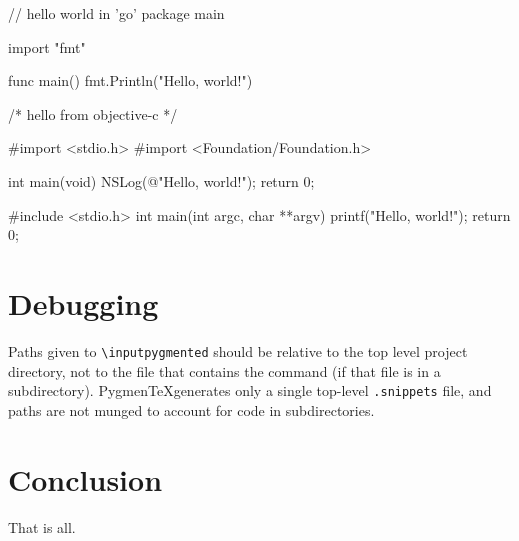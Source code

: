\documentclass[10pt,a4paper]{article}
\begin{document}
\begin{pygmented}[boxing method=mdframed,lang=go,style=exercisestyle]
// hello world in 'go'
package main

import "fmt"

func main() {
   fmt.Println("Hello, world!")
}
\end{pygmented}

\begin{pygmented}[boxing method=mdframed,lang=objective-c,style=exercisestyle,exercisepoints=10]
/* hello from objective-c */

#import <stdio.h>
#import <Foundation/Foundation.h>

int main(void)
{
    NSLog(@"Hello, world!\n");
    return 0;
}
\end{pygmented}


\begin{pygmented}[boxing method=mdframed,lang=c,style=another,frametitle={Hello from C}]
#include <stdio.h>
int main(int argc, char **argv) {
  printf("Hello, world!\n");
  return 0;
}
\end{pygmented}

\section{Debugging}
Paths given to \verb|\inputpygmented| should be relative to the top level project
directory, not to the file that contains the command (if that file is in a
subdirectory).  Pygmen\TeX generates only a single top-level \texttt{.snippets} file,
and paths are not munged to account for code in subdirectories.

\section{Conclusion}

That is all.
\end{document}
